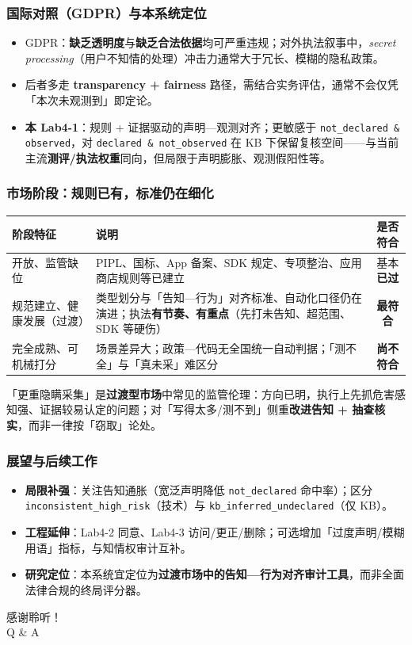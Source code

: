 \documentclass[AutoFakeBold,AutoFakeSlant]{beamer}
\begin{document}
\begin{frame}
    \frametitle{国际对照（GDPR）与本系统定位}
    \small
    \begin{itemize}
        \item GDPR：\textbf{缺乏透明度}与\textbf{缺乏合法依据}均可严重违规；对外执法叙事中，\emph{secret processing}（用户不知情的处理）冲击力通常大于冗长、模糊的隐私政策。
        \item 后者多走 \textbf{transparency + fairness} 路径，需结合实务评估，通常不会仅凭「本次未观测到」即定论。
        \item \textbf{本 Lab4-1}：规则 + 证据驱动的声明—观测对齐；更敏感于 \texttt{not\_declared \& observed}，对 \texttt{declared \& not\_observed} 在 KB 下保留复核空间——与当前主流\textbf{测评/执法权重}同向，但局限于声明膨胀、观测假阳性等。
    \end{itemize}
\end{frame}

\begin{frame}
    \frametitle{市场阶段：规则已有，标准仍在细化}
    \scriptsize
    \begin{tabularx}{\textwidth}{|l|X|c|}
        \hline
        \textbf{阶段特征} & \textbf{说明} & \textbf{是否符合} \\
        \hline
        开放、监管缺位 & PIPL、国标、App 备案、SDK 规定、专项整治、应用商店规则等已建立 & 基本\textbf{已过} \\
        \hline
        规范建立、健康发展（过渡） & 类型划分与「告知—行为」对齐标准、自动化口径仍在演进；执法\textbf{有节奏、有重点}（先打未告知、超范围、SDK 等硬伤） & \textbf{最符合} \\
        \hline
        完全成熟、可机械打分 & 场景差异大；政策—代码无全国统一自动判据；「测不全」与「真未采」难区分 & \textbf{尚不符合} \\
        \hline
    \end{tabularx}
    \vspace{0.4em}
    \small
    「更重隐瞒采集」是\textbf{过渡型市场}中常见的监管伦理：方向已明，执行上先抓危害感知强、证据较易认定的问题；对「写得太多/测不到」侧重\textbf{改进告知 + 抽查核实}，而非一律按「窃取」论处。
\end{frame}

\begin{frame}
    \frametitle{展望与后续工作}
    \small
    \begin{itemize}
        \item \textbf{局限补强}：关注告知通胀（宽泛声明降低 \texttt{not\_declared} 命中率）；区分 \texttt{inconsistent\_high\_risk}（技术）与 \texttt{kb\_inferred\_undeclared}（仅 KB）。
        \item \textbf{工程延伸}：Lab4-2 同意、Lab4-3 访问/更正/删除；可选增加「过度声明/模糊用语」指标，与知情权审计互补。
        \item \textbf{研究定位}：本系统宜定位为\textbf{过渡市场中的告知—行为对齐审计工具}，而非全面法律合规的终局评分器。
    \end{itemize}
\end{frame}

\begin{frame}
    \begin{center}
        {\Huge 感谢聆听！}\\[0.8em]
        {\large Q \& A}
    \end{center}
\end{frame}
\end{document}
